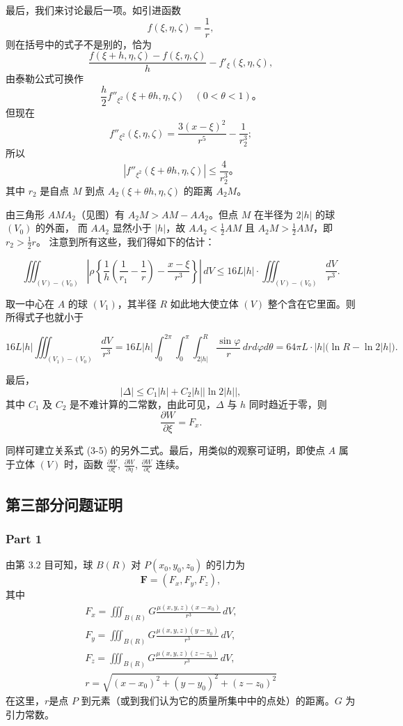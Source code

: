 \documentclass[12pt]{ctexart}
\begin{document}
最后，我们来讨论最后一项。如引进函数
\[
f(\xi, \eta, \zeta) = \frac{1}{r},
\]
则在括号中的式子不是别的，恰为
\[
\frac{f(\xi + h, \eta, \zeta) - f(\xi, \eta, \zeta)}{h} - f'_\xi(\xi, \eta, \zeta),
\]
由泰勒公式可换作
\[
\frac{h}{2} f''_{\xi^2}(\xi + \theta h, \eta, \zeta) \quad (0 < \theta < 1)。
\]
但现在
\[
f''_{\xi^2}(\xi, \eta, \zeta) = \frac{3(x - \xi)^2}{r^5} - \frac{1}{r_2^3};
\]
所以
\[
|f''_{\xi^2}(\xi + \theta h, \eta, \zeta)| \leq \frac{4}{r_2^3}。
\]
其中 $r_2$ 是自点 $M$ 到点 $A_2(\xi + \theta h, \eta, \zeta)$ 的距离 $A_2M$。

由三角形 $AM A_2$（见图）有 $A_2M > AM - AA_2$。但点 $M$ 在半径为 $2|h|$ 的球 $(V_0)$ 的外面，
而 $AA_2$ 显然小于 $|h|$，故 $AA_2 < \frac{1}{2}AM$ 且 $A_2M > \frac{1}{2}AM$，即 $r_2 > \frac{1}{2}r$。
注意到所有这些，我们得如下的估计：

\[
\iiint_{(V) - (V_0)} \left| \rho \left\{ \frac{1}{h} \left( \frac{1}{r_1} - \frac{1}{r} \right) - \frac{x - \xi}{r^3} \right\} \right| \, dV 
\leq 16L |h| \cdot \iiint_{(V) - (V_0)} \frac{dV}{r^3}.
\]

取一中心在 $A$ 的球 $(V_1)$，其半径 $R$ 如此地大使立体 $(V)$ 整个含在它里面。则所得式子也就小于

\[
16L |h| \iiint_{(V_1) - (V_0)} \frac{dV}{r^3} 
= 16L |h| \int_{0}^{2\pi} \int_{0}^{\pi} \int_{2|h|}^R \frac{\sin \varphi}{r} \, dr d\varphi d\theta
= 64\pi L \cdot |h| \big( \ln R - \ln 2|h| \big).
\]

最后，
\[
|\Delta| \leq C_1 |h| + C_2 |h| |\ln 2|h||,
\]
其中 $C_1$ 及 $C_2$ 是不难计算的二常数，由此可见，$\Delta$ 与 $h$ 同时趋近于零，则
\[
\frac{\partial W}{\partial \xi} = F_x.
\]

同样可建立关系式 (3-5) 的另外二式。最后，用类似的观察可证明，即使点 $A$ 属于立体 $(V)$ 时，函数 $\frac{\partial W}{\partial \xi}$, $\frac{\partial W}{\partial \eta}$, $\frac{\partial W}{\partial \zeta}$ 连续。

\subsection{第三部分问题证明}
\subsubsection*{Part 1}
由第 $3.2$ 目可知，球 $B(R)$ 对 $P(x_0, y_0, z_0)$ 的引力为
\[
\mathbf{F} = (F_x, F_y, F_z),
\]
其中
\begin{align*}
F_x = \iiint_{B(R)} G \frac{\mu(x, y, z)(x - x_0)}{r^3} \, dV, \\
F_y = \iiint_{B(R)} G \frac{\mu(x, y, z)(y - y_0)}{r^3} \, dV, \\
F_z = \iiint_{B(R)} G \frac{\mu(x, y, z)(z - z_0)}{r^3} \, dV, \\
r = \sqrt{(x - x_0)^2 + (y - y_0)^2 + (z - z_0)^2}
\end{align*}
在这里，$r$是点 $P$ 到元素（或到我们认为它的质量所集中中的点处）的距离。$G$ 为引力常数。
\end{document}
